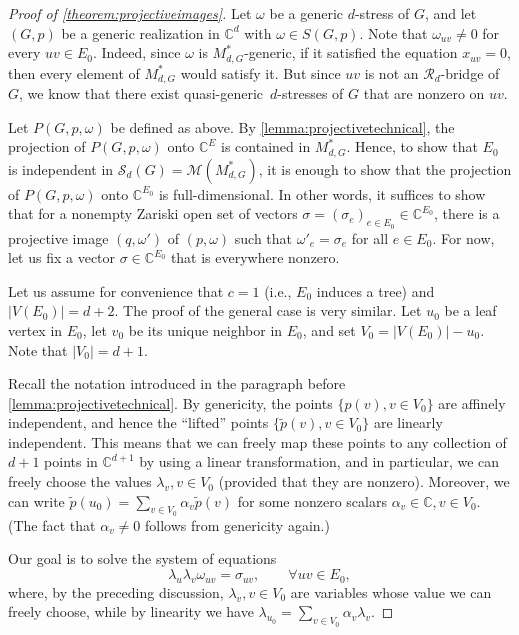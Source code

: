 \documentclass[10pt,a4paper]{amsart}
\newcommand{\CC}{\mathbb{C}}
\newcommand{\algmat}[1]{\mathcal{M}(#1)}
\newcommand{\quasigen}{quasi-generic}
\newcommand{\stressmatroid}[2]{\mathcal{S}_{#1}(#2)}
\begin{document}
\begin{proof}[Proof of \cref{theorem:projectiveimages}]
    Let $\omega$ be a generic $d$-stress of $G$, and let $(G,p)$ be a generic realization in $\CC^d$ with $\omega \in S(G,p)$. Note that $\omega_{uv} \neq 0$ for every $uv \in E_0$. Indeed, since $\omega$ is $M_{d,G}^*$-generic, if it satisfied the equation $x_{uv} = 0$, then every element of $M_{d,G}^*$ would satisfy it. But since $uv$ is not an $\mathcal{R}_d$-bridge of $G$, we know that there exist \quasigen\ $d$-stresses of $G$ that are nonzero on $uv$. 
    
    Let $P(G,p,\omega)$ be defined as above. By \cref{lemma:projectivetechnical}, the projection of $P(G,p,\omega)$ onto $\CC^E$ is contained in $M_{d,G}^*$. Hence, to show that $E_0$ is independent in $\stressmatroid{d}{G} = \algmat{M_{d,G}^*}$, it is enough to show that the projection of $P(G,p,\omega)$ onto $\CC^{E_0}$ is full-dimensional. In other words, it suffices to show that for a nonempty Zariski open set of vectors $\sigma = {(\sigma_e)}_{e \in E_0} \in \CC^{E_0}$, there is a projective image $(q,\omega')$ of $(p,\omega)$ such that $\omega'_e = \sigma_e$ for all $e \in E_0$. For now, let us fix a vector $\sigma \in \CC^{E_0}$ that is everywhere nonzero.
    
    Let us assume for convenience that $c=1$ (i.e., $E_0$ induces a tree) and $|V(E_0)| = d+2$. The proof of the general case is very similar. Let $u_0$ be a leaf vertex in $E_0$, let $v_0$ be its unique neighbor in $E_0$, and set $V_0 = |V(E_0)| - u_0$. Note that $|V_0| = d+1$. 
    
    Recall the notation introduced in the paragraph before \cref{lemma:projectivetechnical}. By genericity, the points $\{p(v), v \in V_0\}$ are affinely independent, and hence the ``lifted'' points $\{\tilde{p}(v), v\in V_0\}$ are linearly independent. This means that we can freely map these points to any collection of $d+1$ points in $\CC^{d+1}$ by using a linear transformation, and in particular, we can freely choose the values $\lambda_v, v \in V_0$ (provided that they are nonzero). Moreover, we can write $\tilde{p}(u_0) = \sum_{v \in V_0}\alpha_v \tilde{p}(v)$ for some nonzero scalars $\alpha_v \in \CC, v \in V_0$. (The fact that $\alpha_v \neq 0$ follows from genericity again.) 
    
    Our goal is to solve the system of equations
    \begin{equation}\label{eq:projective}
        \lambda_u \lambda_v \omega_{uv} = \sigma_{uv}, \hspace{2em} \forall uv \in E_0,
    \end{equation}
    where, by the preceding discussion, $\lambda_v, v \in V_0$ are variables whose value we can freely choose, while by linearity we have $\lambda_{u_0} = \sum_{v \in V_0} \alpha_v \lambda_v$.


\end{proof}
\end{document}
